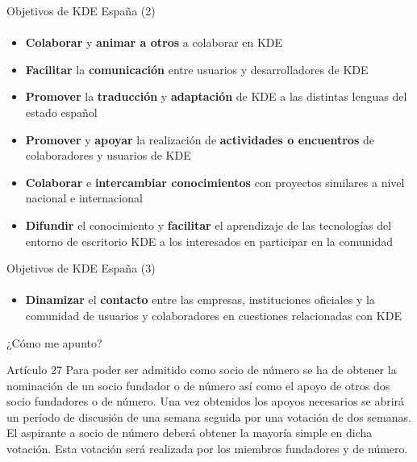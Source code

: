 \documentclass[12pt]{beamer}
\begin{document}
\begin{frame}{Objetivos de KDE España (2)}
  \framesubtitle{}
  \begin{itemize}
    \item \textbf{Colaborar} y \textbf{animar a otros} a colaborar en KDE
    \item \textbf{Facilitar} la \textbf{comunicación} entre usuarios y desarrolladores de KDE
    \item \textbf{Promover} la \textbf{traducción} y \textbf{adaptación} de KDE a las distintas lenguas del estado español
    \item \textbf{Promover} y \textbf{apoyar} la realización de \textbf{actividades o encuentros} de colaboradores y usuarios de KDE
    \item \textbf{Colaborar} e \textbf{intercambiar conocimientos} con proyectos similares a nivel nacional e internacional
    \item \textbf{Difundir} el conocimiento y \textbf{facilitar} el aprendizaje de las tecnologías del entorno de escritorio KDE a los interesados en participar en la comunidad
  \end{itemize}
\end{frame}

\begin{frame}{Objetivos de KDE España (3)}
  \framesubtitle{}
  \begin{itemize}
    \item \textbf{Dinamizar} el \textbf{contacto} entre las empresas, instituciones oficiales y la comunidad de usuarios y colaboradores en cuestiones relacionadas con KDE
  \end{itemize}
\end{frame}

\begin{frame}{¿Cómo me apunto?}
    \begin{block}{Artículo 27}
        Para poder ser admitido como socio de número se ha de obtener la nominación de un socio fundador o de número así como el apoyo de otros dos socio fundadores o de número. Una vez obtenidos los apoyos necesarios se abrirá un período de discusión de una semana seguida por una votación de dos semanas. El aspirante a socio de número deberá obtener la mayoría simple en dicha votación. Esta votación será realizada por los miembros fundadores y de número.
    \end{block}
\end{frame}

\end{document}
